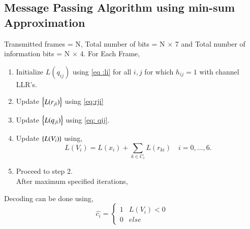 \documentclass[journal,12pt,twocolumn]{IEEEtran}
\begin{document}
\subsection{Message Passing Algorithm using min-sum Approximation}
Transmitted frames = N, Total number of bits = N $\times$ 7 and Total number of information bits = N $\times$ 4.
For Each Frame,
\begin{enumerate}
\item Initialize $L(q_{ij})$ using \eqref{eq :li} for all $i,j$ for which $h_{ij}=1$ with channel LLR's.
\item Update $\left\{L(r_{ji})\right\}$ using \eqref{eq:rji}
\item Update $\left\{L(q_{ji})\right\}$ using \eqref{eq: qij}.
\item Update $\left\{L(V_i)\right\}$ using,
\begin{equation}
L(V_i)=L(x_i)+\sum_{k \in C_i} L(r_{ki}) \quad i=0,\dots,6.
\end{equation}
\item Proceed to step 2.\\
After maximum specified iterations,

\end{enumerate}
Decoding can be done using,
\begin{equation}
\hat{c_i} = \begin{cases}
1 & L(V_i) < 0\\
0 & else
\end{cases}
\end{equation}
%
\end{document}

